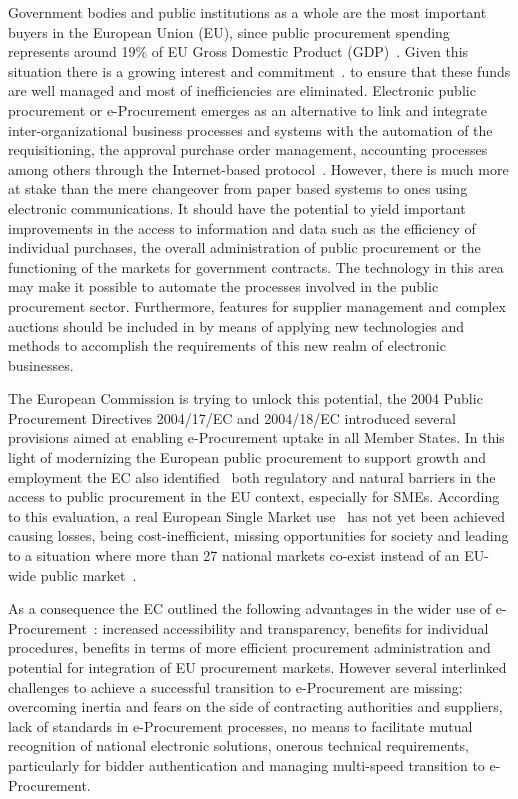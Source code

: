 Government bodies and public institutions as a whole are the most important buyers in the European Union (EU), since public procurement spending represents around 19\% of 
EU Gross Domestic Product (GDP)~\cite{d2010}. Given this situation there is a growing interest and commitment~\cite{d2010a}. to ensure that these funds are 
well managed and most of inefficiencies are eliminated. Electronic public procurement or e-Procurement emerges as an alternative to link and 
integrate inter-organizational business processes and systems with the automation of the requisitioning, the approval purchase order 
management, accounting processes among others through the Internet-based protocol~\cite{Podlogar2007}.  However, there is much more at stake than the mere changeover 
from paper based systems to ones using electronic communications. It should have the potential to yield important improvements in the access to information and data such as the efficiency of individual purchases, the overall administration of public procurement or the functioning of the markets for government contracts. 
The technology in this area may make it possible to automate the processes involved in the public procurement sector. Furthermore, features for supplier 
management and complex auctions should be included in by means of applying new technologies and methods to accomplish the requirements of this new realm of electronic businesses.


The European Commission is trying to unlock this potential, the 2004 Public Procurement Directives 2004/17/EC and 2004/18/EC 
introduced several provisions aimed at enabling e-Procurement uptake in all Member States. In this light of 
modernizing the European public procurement to support growth and employment the EC also identified~\cite{siemensEval} both regulatory and natural barriers in the access to 
public procurement in the EU context, especially for SMEs. According to this evaluation, a real European Single Market use~\cite{d2011} 
has not yet been achieved causing losses, being cost-inefficient, missing opportunities for society and leading to a 
situation where more than 27 national markets co-exist instead of an EU-wide public market~\cite{monti2010}.

As a consequence the EC outlined the following advantages in the wider use of e-Procurement~\cite{d2010}: increased accessibility and transparency, benefits for individual procedures, 
benefits in terms of more efficient procurement administration and potential for integration of EU procurement markets. 
However several interlinked challenges to achieve a successful transition to e-Procurement are missing: overcoming inertia 
and fears on the side of contracting authorities and suppliers, lack of standards in e-Procurement processes, no means 
to facilitate mutual recognition of national electronic solutions, onerous technical requirements, 
particularly for bidder authentication and managing multi-speed transition to e-Procurement. 


